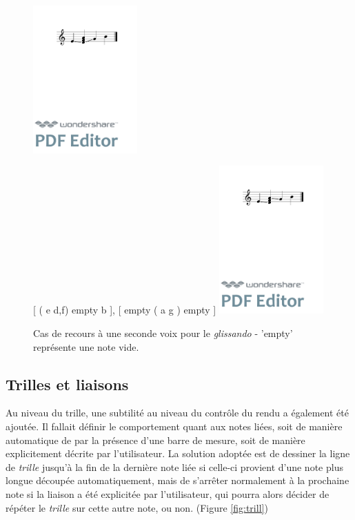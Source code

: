 \documentclass{article}
\newenvironment{gmncode}	{\vspace{-2mm}\small\verbatim}{\endverbatim\vspace{-2mm}}
\begin{document}
\begin{figure}[h]
\centering
\begin{gmncode}
[ \glissando(e {d,f,a} g) b ]
\end{gmncode}
\includegraphics[width=4cm]{img/glissandopb.pdf}

\begin{gmncode}
{ 
  [ \glissando( e {d,f}) empty b ],
  [  empty \glissando( a g ) empty ] 
}
\end{gmncode}
\includegraphics[width=4cm]{img/glissandosanspb.pdf}
\caption{Cas de recours à une seconde voix pour le \emph{glissando} -
'empty' représente une note vide.}
\label{fig:glissandopb}
\end{figure}


\subsection{Trilles et liaisons}\label{subsec:trillesLiaison}

Au niveau du trille, une subtilité au niveau du contr\^ole du rendu a également été ajoutée. Il fallait définir le comportement quant aux notes liées, soit de manière automatique de par la présence d'une barre de mesure, soit de manière explicitement décrite par l'utilisateur. La solution adoptée est de dessiner la ligne de \emph{trille} jusqu'à la fin de la dernière note liée si celle-ci provient d'une note plus longue découpée automatiquement, mais de s'arrêter normalement à la prochaine note si la liaison a été explicitée par l'utilisateur, qui pourra alors décider de répéter le \emph{trille} sur cette autre note, ou non. (Figure \ref{fig:trill})
\end{document}
